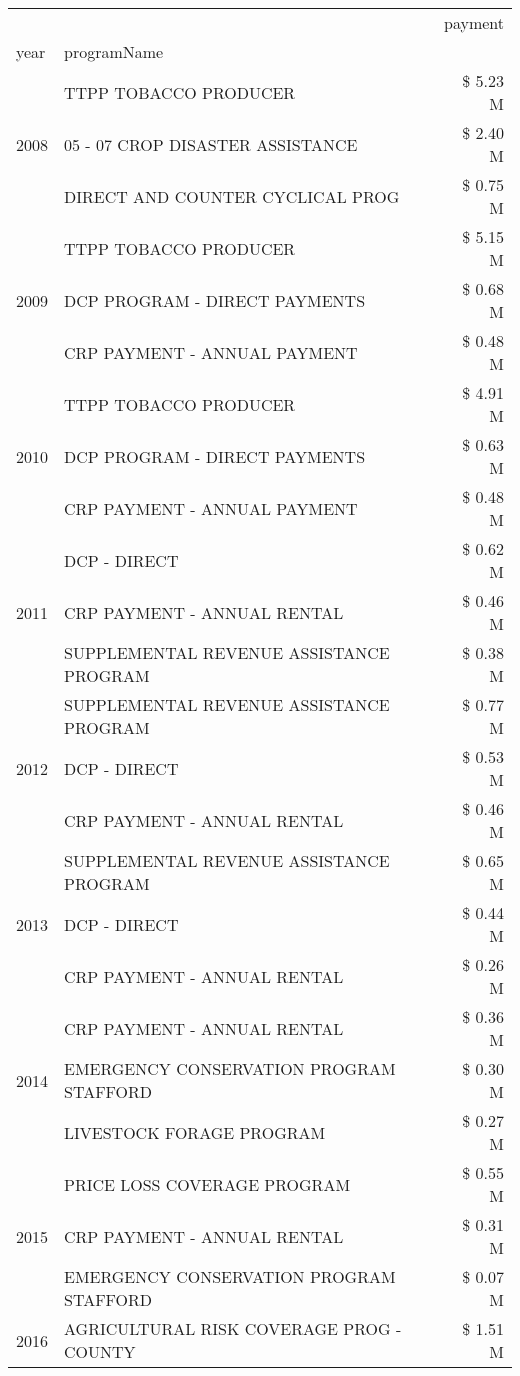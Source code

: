 \begin{tabular}{llr}
\toprule
 &  & payment \\
year & programName &  \\
\midrule
\multirow[t]{3}{*}{2008} & TTPP TOBACCO PRODUCER & \$ 5.23 M \\
 & 05 - 07 CROP DISASTER ASSISTANCE & \$ 2.40 M \\
 & DIRECT AND COUNTER CYCLICAL PROG & \$ 0.75 M \\
\cline{1-3}
\multirow[t]{3}{*}{2009} & TTPP TOBACCO PRODUCER & \$ 5.15 M \\
 & DCP PROGRAM - DIRECT PAYMENTS & \$ 0.68 M \\
 & CRP PAYMENT - ANNUAL PAYMENT & \$ 0.48 M \\
\cline{1-3}
\multirow[t]{3}{*}{2010} & TTPP TOBACCO PRODUCER & \$ 4.91 M \\
 & DCP PROGRAM - DIRECT PAYMENTS & \$ 0.63 M \\
 & CRP PAYMENT - ANNUAL PAYMENT & \$ 0.48 M \\
\cline{1-3}
\multirow[t]{3}{*}{2011} & DCP - DIRECT & \$ 0.62 M \\
 & CRP PAYMENT - ANNUAL RENTAL & \$ 0.46 M \\
 & SUPPLEMENTAL REVENUE ASSISTANCE PROGRAM & \$ 0.38 M \\
\cline{1-3}
\multirow[t]{3}{*}{2012} & SUPPLEMENTAL REVENUE ASSISTANCE PROGRAM & \$ 0.77 M \\
 & DCP - DIRECT & \$ 0.53 M \\
 & CRP PAYMENT - ANNUAL RENTAL & \$ 0.46 M \\
\cline{1-3}
\multirow[t]{3}{*}{2013} & SUPPLEMENTAL REVENUE ASSISTANCE PROGRAM & \$ 0.65 M \\
 & DCP - DIRECT & \$ 0.44 M \\
 & CRP PAYMENT - ANNUAL RENTAL & \$ 0.26 M \\
\cline{1-3}
\multirow[t]{3}{*}{2014} & CRP PAYMENT - ANNUAL RENTAL & \$ 0.36 M \\
 & EMERGENCY CONSERVATION PROGRAM STAFFORD & \$ 0.30 M \\
 & LIVESTOCK FORAGE PROGRAM & \$ 0.27 M \\
\cline{1-3}
\multirow[t]{3}{*}{2015} & PRICE LOSS COVERAGE PROGRAM & \$ 0.55 M \\
 & CRP PAYMENT - ANNUAL RENTAL & \$ 0.31 M \\
 & EMERGENCY CONSERVATION PROGRAM STAFFORD & \$ 0.07 M \\
\cline{1-3}
\multirow[t]{3}{*}{2016} & AGRICULTURAL RISK COVERAGE PROG - COUNTY & \$ 1.51 M \\

\end{tabular}
